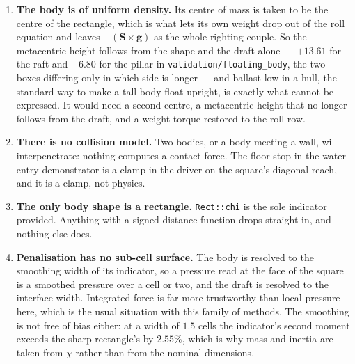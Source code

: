 \documentclass[11pt,a4paper]{article}
\newcommand{\code}[1]{\texttt{\small #1}}
\begin{document}
\begin{enumerate}[leftmargin=1.4em,itemsep=4pt]
\item \textbf{The body is of uniform density.} Its centre of mass is taken to be
  the centre of the rectangle, which is what lets its own weight drop out of the
  roll equation and leaves $-(\bm S\times\bm g)$ as the whole righting couple. So
  the metacentric height follows from the shape and the draft alone ---
  $+13.61$ for the raft and $-6.80$ for the pillar in
  \code{validation/floating\_body}, the two boxes differing only in which side is
  longer --- and ballast low in a hull, the standard way to make a tall body
  float upright, is exactly what cannot be expressed. It would need a second
  centre, a metacentric height that no longer follows from the draft, and a
  weight torque restored to the roll row.

\item \textbf{There is no collision model.} Two bodies, or a body meeting a
  wall, will interpenetrate: nothing computes a contact force. The floor stop in
  the water-entry demonstrator is a clamp in the driver on the square's diagonal
  reach, and it is a clamp, not physics.

\item \textbf{The only body shape is a rectangle.} \code{Rect::chi} is the sole
  indicator provided. Anything with a signed distance function drops straight
  in, and nothing else does.

\item \textbf{Penalisation has no sub-cell surface.} The body is resolved to the
  smoothing width of its indicator, so a pressure read at the face of the square
  is a smoothed pressure over a cell or two, and the draft is resolved to the
  interface width. Integrated force is far more trustworthy than local pressure
  here, which is the usual situation with this family of methods. The smoothing
  is not free of bias either: at a width of $1.5$ cells the indicator's second
  moment exceeds the sharp rectangle's by $2.55\%$, which is why mass and inertia
  are taken from $\chi$ rather than from the nominal dimensions.


\end{enumerate}
\end{document}
